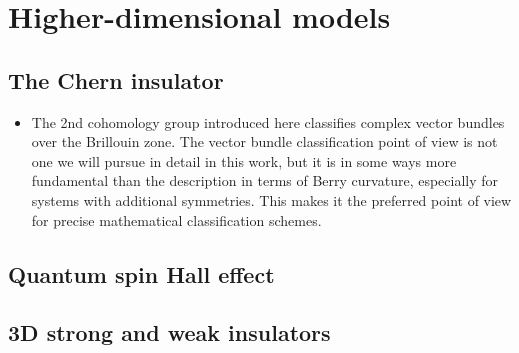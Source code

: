 \section{Higher-dimensional models}

\subsection{The Chern insulator}\label{sec:Chern}

{\color{blue}
\begin{itemize}
	\item The 2nd cohomology group introduced here classifies complex vector bundles over the Brillouin zone. The vector bundle classification point of view is not one we will pursue in detail in this work, but it is in some ways more fundamental than the description in terms of Berry curvature, especially for systems with additional symmetries. This makes it the preferred point of view for precise mathematical classification schemes.
\end{itemize}	
}

\subsection{Quantum spin Hall effect}\label{sec:QSHE}

\subsection{3D strong and weak insulators}\label{sec:3D-Z2}


\label{sec:symm-classes}